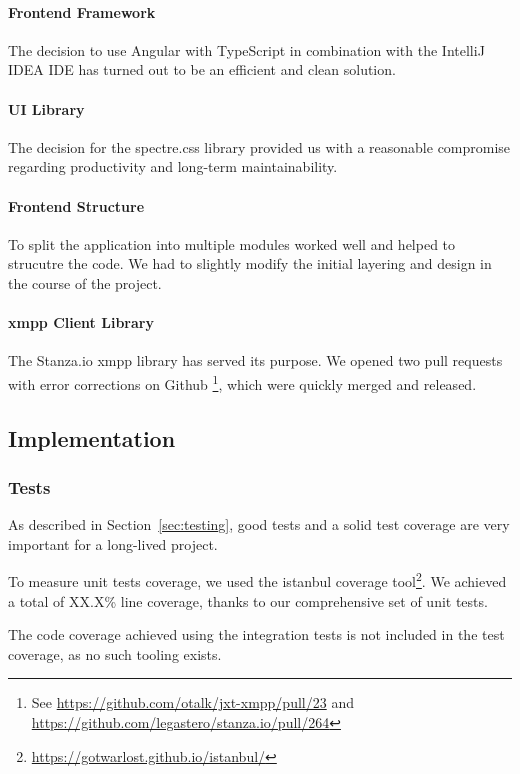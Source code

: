 \paragraph{Frontend Framework}
The decision to use Angular with TypeScript in combination with the IntelliJ IDEA IDE has turned out to be an efficient and clean solution.

\paragraph{UI Library}
The decision for the spectre.css library provided us with a reasonable compromise regarding productivity and long-term maintainability.

\paragraph{Frontend Structure}
To split the application into multiple modules worked well and helped to strucutre the code.
We had to slightly modify the initial layering and design in the course of the project.

\paragraph{\gls{xmpp} Client Library}
The Stanza.io \gls{xmpp} library has served its purpose.
We opened two pull requests with error corrections on Github \footnote{See \url{https://github.com/otalk/jxt-xmpp/pull/23} and \url{https://github.com/legastero/stanza.io/pull/264}}, which were quickly merged and released.

\subsection{Implementation}

\subsubsection{Tests}
As described in Section~\ref{sec:testing}, good tests and a solid test coverage are very important for a long-lived project.

To measure unit tests coverage, we used the istanbul coverage tool\footnote{\url{https://gotwarlost.github.io/istanbul/}}. We achieved a total of XX.X\% line coverage, thanks to our comprehensive set of unit tests. %

The code coverage achieved using the integration tests is not included in the test coverage, as no such tooling exists.

